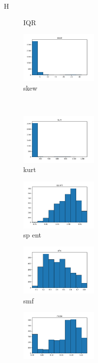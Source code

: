 \documentclass[a4paper]{article}    %
\begin{document}
\begin{figure}{H}
\begin{subfigure}{0.32\textwidth}
        \caption{IQR}
        \label{fig:sub_raw_5}
    \end{subfigure}\hfill
    \begin{subfigure}{0.32\textwidth}
        \centering
        \includegraphics[width=3.85cm]{raw_5_skew}
        \caption{skew}
        \label{fig:sub_raw_6}
    \end{subfigure}
    \\
    \begin{subfigure}{0.32\textwidth}
        \centering
        \includegraphics[width=3.85cm]{raw_6_kurt}
        \caption{kurt}
        \label{fig:sub_raw_7}
    \end{subfigure}\hfill
    \begin{subfigure}{0.32\textwidth}
        \centering
        \includegraphics[width=3.85cm]{raw_7_sp_ent}
        \caption{sp ent}
        \label{fig:sub_raw_8}
    \end{subfigure}\hfill
    \begin{subfigure}{0.32\textwidth}
        \centering
        \includegraphics[width=3.85cm]{raw_8_sfm}
        \caption{smf}
        \label{fig:sub_raw_9}
    \end{subfigure}\hfill
    \begin{subfigure}{0.32\textwidth}
        \centering
        \includegraphics[width=3.85cm]{raw_9_mode}

\end{subfigure}
\end{figure}
\end{document}
